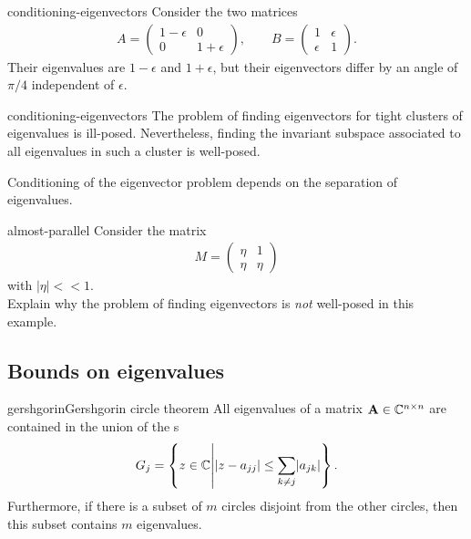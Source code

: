\begin{Example}{conditioning-eigenvectors}
  Consider the two matrices
  \begin{gather}
    A =
    \begin{pmatrix}
      1-\epsilon & 0\\ 0 & 1+\epsilon
    \end{pmatrix},
    \qquad
    B =
    \begin{pmatrix}
      1&\epsilon\\\epsilon&1
    \end{pmatrix}.
  \end{gather}
  Their eigenvalues are $1-\epsilon$ and $1+\epsilon$, but their
  eigenvectors differ by an angle of $\pi/4$ independent of
  $\epsilon$.
\end{Example}

\begin{Remark}{conditioning-eigenvectors}
  The problem of finding eigenvectors for tight clusters of
  eigenvalues is ill-posed. Nevertheless, finding the invariant
  subspace associated to all eigenvalues in such a cluster is
  well-posed.

  Conditioning of the eigenvector problem depends on the separation of
  eigenvalues.
\end{Remark}

\begin{Problem}{almost-parallel}
  Consider the matrix 
  \begin{gather} 
    M = 
    \begin{pmatrix}
      \eta & 1\\  \eta &\eta
    \end{pmatrix}
   \end{gather}
   with $|\eta| << 1$.\\
  Explain why the problem of finding eigenvectors is \textit{not} well-posed in this example.
\end{Problem}


\subsection{Bounds on eigenvalues}


\begin{Theorem*}{gershgorin}{Gershgorin circle theorem}
  All eigenvalues of a matrix $\mathbf A\in\mathbb C^{n\times n}$ are contained in the
  union of the s
  \begin{gather}
    G_j = \left\{ z\in \mathbb C \middle| \lvert z-a_{jj}\rvert \le \sum_{k\neq j} \lvert a_{jk}\rvert\right\}.
  \end{gather}
  Furthermore, if there is a subset of $m$ circles disjoint from the
  other circles, then this subset contains $m$ eigenvalues.
\end{Theorem*}

